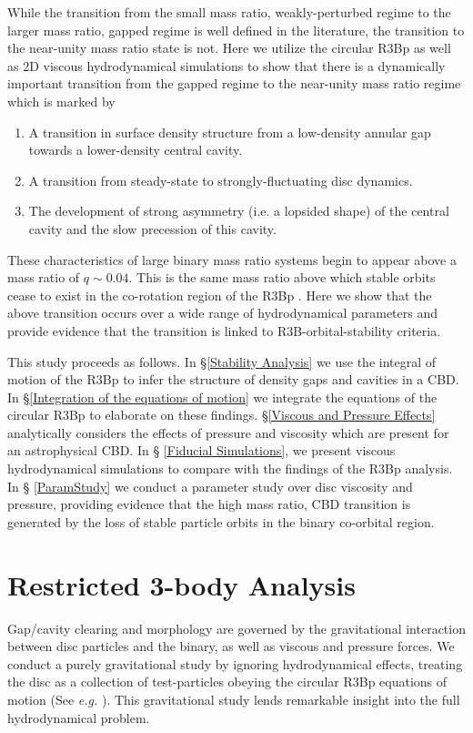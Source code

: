 \documentclass[usenatbib]{mnras}
\begin{document}
While the transition from the small mass ratio, weakly-perturbed
regime to the larger mass ratio, gapped regime is well defined in the
literature, the transition to the near-unity mass ratio state is
not. Here we utilize the circular R3Bp as well as 2D viscous
hydrodynamical simulations to show that there is a dynamically
important transition from the gapped regime to the near-unity mass
ratio regime which is marked by
\begin{enumerate}
\item A transition in surface density structure from a low-density
  annular gap towards a lower-density central cavity.
\item A transition from steady-state to strongly-fluctuating disc
  dynamics.
\item The development of strong asymmetry (i.e. a lopsided shape) of
  the central cavity and the slow precession of this cavity.
\end{enumerate}
These characteristics of large binary mass ratio systems begin to
appear above a mass ratio of $q \sim 0.04$. This is the same mass
ratio above which stable orbits cease to exist in the co-rotation region
of the R3Bp \citep{MD:SSD}. Here we show that the above transition 
occurs over a wide range of hydrodynamical parameters and provide 
evidence that the transition is linked to R3B-orbital-stability criteria.





This study proceeds as follows. In \S \ref{Stability Analysis} we use
the integral of motion of the R3Bp to infer the structure of density
gaps and cavities in a CBD. In \S \ref{Integration
  of the equations of motion} we integrate the equations of the
circular R3Bp to elaborate on these findings. \S \ref{Viscous and
  Pressure Effects} analytically considers the effects of pressure and
viscosity which are present for an astrophysical CBD. In \S
\ref{Fiducial Simulations}, we present viscous hydrodynamical
simulations to compare with the findings of the R3Bp analysis. In \S
\ref{ParamStudy} we conduct a parameter study over disc viscosity and
pressure, providing evidence that the high mass ratio, CBD transition
is generated by the loss of stable particle orbits in the binary
co-orbital region.


\section{Restricted 3-body Analysis}
\label{Analysis via the restricted 3-body problem}
Gap/cavity clearing and morphology are governed by the gravitational
interaction between disc particles and the binary, as well as viscous
and pressure forces. We conduct a purely gravitational study by
ignoring hydrodynamical effects, treating the disc as a collection of
test-particles obeying the circular R3Bp equations of motion (See
\textit{e.g.} \cite{MD:SSD}). This gravitational study lends
remarkable insight into the full hydrodynamical problem.
\end{document}
